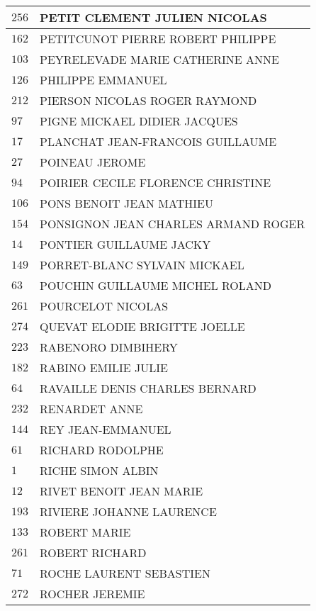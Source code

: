 \begin{xltabular}{\linewidth}{|l|X|}
    \hline
    $256$ & PETIT CLEMENT JULIEN NICOLAS \\
    \hline
    $162$ & PETITCUNOT PIERRE ROBERT PHILIPPE \\
    \hline
    $103$ & PEYRELEVADE MARIE CATHERINE ANNE \\
    \hline
    $126$ & PHILIPPE EMMANUEL \\
    \hline
    $212$ & PIERSON NICOLAS ROGER RAYMOND \\
    \hline
    $97$ & PIGNE MICKAEL DIDIER JACQUES \\
    \hline
    $17$ & PLANCHAT JEAN-FRANCOIS GUILLAUME \\
    \hline
    $27$ & POINEAU JEROME \\
    \hline
    $94$ & POIRIER CECILE FLORENCE CHRISTINE \\
    \hline
    $106$ & PONS BENOIT JEAN MATHIEU \\
    \hline
    $154$ & PONSIGNON JEAN CHARLES ARMAND ROGER \\
    \hline
    $14$ & PONTIER GUILLAUME JACKY \\
    \hline
    $149$ & PORRET-BLANC SYLVAIN MICKAEL \\
    \hline
    $63$ & POUCHIN GUILLAUME MICHEL ROLAND \\
    \hline
    $261$ & POURCELOT NICOLAS \\
    \hline
    $274$ & QUEVAT ELODIE BRIGITTE JOELLE \\
    \hline
    $223$ & RABENORO DIMBIHERY \\
    \hline
    $182$ & RABINO EMILIE JULIE \\
    \hline
    $64$ & RAVAILLE DENIS CHARLES BERNARD \\
    \hline
    $232$ & RENARDET ANNE \\
    \hline
    $144$ & REY JEAN-EMMANUEL \\
    \hline
    $61$ & RICHARD RODOLPHE \\
    \hline
    $1$ & RICHE SIMON ALBIN \\
    \hline
    $12$ & RIVET BENOIT JEAN MARIE \\
    \hline
    $193$ & RIVIERE JOHANNE LAURENCE \\
    \hline
    $133$ & ROBERT MARIE \\
    \hline
    $261$ & ROBERT RICHARD \\
    \hline
    $71$ & ROCHE LAURENT SEBASTIEN \\
    \hline
    $272$ & ROCHER JEREMIE \\

\end{xltabular}
